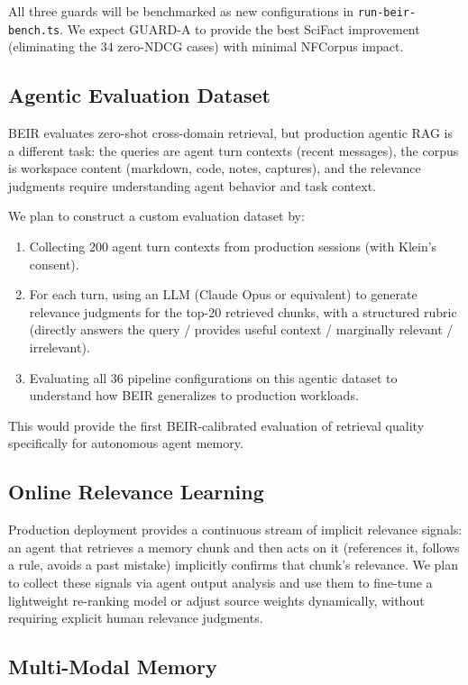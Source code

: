 \documentclass[11pt]{article}
\begin{document}
All three guards will be benchmarked as new configurations in \texttt{run-beir-bench.ts}.
We expect GUARD-A to provide the best SciFact improvement (eliminating the 34 zero-NDCG
cases) with minimal NFCorpus impact.

\subsection{Agentic Evaluation Dataset}
\label{sec:future:agentic-eval}

BEIR evaluates zero-shot cross-domain retrieval, but production agentic RAG is a different
task: the queries are agent turn contexts (recent messages), the corpus is workspace content
(markdown, code, notes, captures), and the relevance judgments require understanding agent
behavior and task context.

We plan to construct a custom evaluation dataset by:
\begin{enumerate}[leftmargin=2em, itemsep=3pt]
  \item Collecting 200 agent turn contexts from production sessions (with Klein's consent).
  \item For each turn, using an LLM (Claude Opus or equivalent) to generate relevance
  judgments for the top-20 retrieved chunks, with a structured rubric (directly answers
  the query / provides useful context / marginally relevant / irrelevant).
  \item Evaluating all 36 pipeline configurations on this agentic dataset to understand
  how BEIR generalizes to production workloads.
\end{enumerate}

This would provide the first BEIR-calibrated evaluation of retrieval quality specifically
for autonomous agent memory.

\subsection{Online Relevance Learning}

Production deployment provides a continuous stream of implicit relevance signals: an agent
that retrieves a memory chunk and then acts on it (references it, follows a rule, avoids
a past mistake) implicitly confirms that chunk's relevance. We plan to collect these
signals via agent output analysis and use them to fine-tune a lightweight re-ranking model
or adjust source weights dynamically, without requiring explicit human relevance judgments.

\subsection{Multi-Modal Memory}
\end{document}
